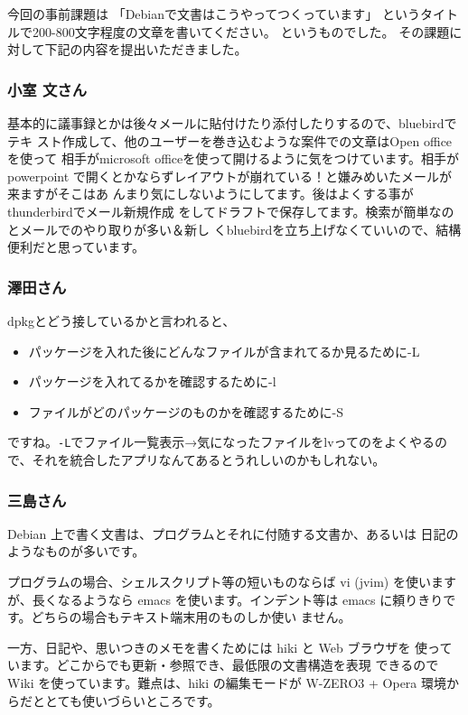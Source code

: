 \documentclass[mingoth,a4paper]{jsarticle}
\begin{document}
今回の事前課題は
「Debianで文書はこうやってつくっています」
というタイトルで200-800文字程度の文章を書いてください。
というものでした。
その課題に対して下記の内容を提出いただきました。

\subsubsection{小室 文さん}
基本的に議事録とかは後々メールに貼付けたり添付したりするので、bluebirdでテキ
スト作成して、他のユーザーを巻き込むような案件での文章はOpen officeを使って
相手がmicrosoft officeを使って開けるように気をつけています。相手がpowerpoint
で開くとかならずレイアウトが崩れている！と嫌みめいたメールが来ますがそこはあ
んまり気にしないようにしてます。後はよくする事がthunderbirdでメール新規作成
をしてドラフトで保存してます。検索が簡単なのとメールでのやり取りが多い＆新し
くbluebirdを立ち上げなくていいので、結構便利だと思っています。

\subsubsection{澤田さん}

dpkgとどう接しているかと言われると、

\begin{itemize}
 \item  パッケージを入れた後にどんなファイルが含まれてるか見るために-L
 \item  パッケージを入れてるかを確認するために-l
 \item  ファイルがどのパッケージのものかを確認するために-S
\end{itemize}

ですね。\texttt{-L}でファイル一覧表示→気になったファイルをlvってのをよくやるの
で、それを統合したアプリなんてあるとうれしいのかもしれない。


\subsubsection{三島さん}
Debian 上で書く文書は、プログラムとそれに付随する文書か、あるいは
日記のようなものが多いです。

プログラムの場合、シェルスクリプト等の短いものならば vi (jvim)
を使いますが、長くなるようなら emacs を使います。インデント等は
emacs に頼りきりです。どちらの場合もテキスト端末用のものしか使い
ません。

一方、日記や、思いつきのメモを書くためには hiki と Web ブラウザを
使っています。どこからでも更新・参照でき、最低限の文書構造を表現
できるので Wiki を使っています。難点は、hiki の編集モードが
W-ZERO3 + Opera 環境からだととても使いづらいところです。
\end{document}
